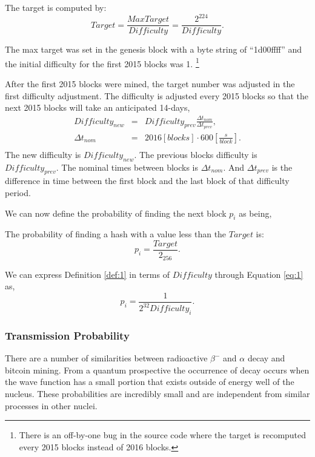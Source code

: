\documentclass[runningheads]{llncs}
\begin{document}
The target is computed by:
\begin{equation}
    Target=\frac{MaxTarget}{Difficulty}=\frac{2^{224}}{Difficulty}. \label{eq:1}
\end{equation}

The max target was set in the genesis block with a byte string of ``1d00ffff'' and the initial difficulty for the first 2015 blocks was 1.
\footnote{There is an off-by-one bug in the source code where the target is recomputed every 2015 blocks instead of 2016 blocks.}

After the first 2015 blocks were mined, the target number was adjusted in the first difficulty adjustment.
The difficulty is adjusted every 2015 blocks so that the next 2015 blocks will take an anticipated 14-days,
\begin{eqnarray}
    Difficulty_{new} &=& Difficulty_{prev}\frac{\Delta t_{nom}}{\Delta t_{prev}}, \label{eq:2} \\
    \Delta t_{nom}   &=& 2016 [blocks] \cdot 600[\frac{s}{block}]. \\
\end{eqnarray}
The new difficulty is $Difficulty_{new}$.
The previous blocks difficulty is $Difficulty_{prev}$.
The nominal times between blocks is $\Delta t_{nom}$.
And $\Delta t_{prev}$ is the difference in time between the first block and the last block of that difficulty period.

We can now define the probability of finding the next block $p_i$ as being,
\begin{definition} \label{def:1}
    The probability of finding a hash with a value less than the $Target$ is:
    \begin{equation}
        p_i = \frac{Target}{2_{256}}.
    \end{equation}
\end{definition}

We can express Definition \ref{def:1} in terms of $Difficulty$ through Equation \ref{eq:1} as,
\begin{equation}
    p_i = \frac{1}{2^{32}Difficulty_i}. \label{eq:3}
\end{equation}

\subsubsection{Transmission Probability}
There are a number of similarities between radioactive $\beta^-$ and $\alpha$ decay and bitcoin mining.
From a quantum prospective the occurrence of decay occurs when the wave function has a small portion that exists outside of energy well of the nucleus.
These probabilities are incredibly small and are independent from similar processes in other nuclei.
\end{document}
